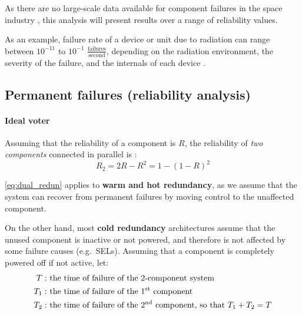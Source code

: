 \documentclass[a4paper,nobib]{tufte-book}
\def\acusepage#1{}
\begin{document}
As there are no large-scale data available for component failures in the space industry \autocite{esatec-qqd_effective_reliability_2016}, this analysis will present results over a range of reliability values.

As an example, failure rate of a device or unit due to radiation can range between \(10^{-11}\) to \(10^{-1}\) \(\frac{\text{failures}}{\text{second}}\), depending on the radiation environment, the severity of the failure, and the internals of each device \autocite[158-159]{gupta_analysis_single_2017}.


\subsection{Permanent failures (reliability analysis)}

\paragraph{\textbf{Ideal voter}}\hspace{0pt}
\acusepage{voter}


Assuming that the reliability of a component is \(R\), the reliability of \emph{two components} connected in parallel is \autocite[31]{birolini_reliability_engineering_2004}:
\begin{equation}
R_2 = 2R - R^2 = 1 - (1 - R)^2 \label{eq:dual_redun}
\end{equation}
	
	
\eqref{eq:dual_redun} applies to \textbf{warm and hot redundancy}, as we assume that the system can recover from permanent failures by moving control to the unaffected component.

On the other hand, most \textbf{cold redundancy} architectures assume that the unused component is inactive or not powered, and therefore is not affected by some failure causes (e.g.\ \acsp{SEL}). Assuming that a component is completely powered off if not active, let:
\begin{align*}
T: & \text{ the time of failure of the 2-component system}\\
T_1: & \text{ the time of failure of the 1\textsuperscript{st} component}\\
T_2: & \text{ the time of failure of the 2\textsuperscript{nd} component, so that } T_1 + T_2 = T
\end{align*}
\end{document}
